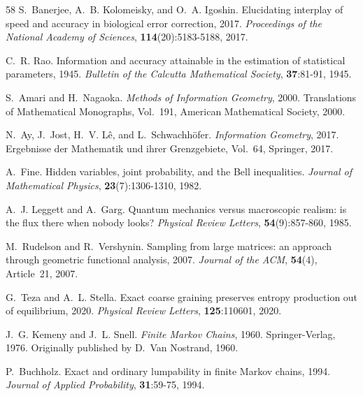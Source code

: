 \documentclass[11pt]{article}
\numberwithin{equation}{section}
\theoremstyle{thmcompact}
\theoremstyle{remark}
\begin{document}
\begin{thebibliography}{58}
{S.~Banerjee}, {A.~B. Kolomeisky}, and {O.~A. Igoshin}.
\newblock Elucidating interplay of speed and accuracy in biological error correction, 2017.
\newblock \emph{Proceedings of the National Academy of Sciences}, \textbf{114}(20):5183-5188, 2017.

{C.~R. Rao}.
\newblock Information and accuracy attainable in the estimation of statistical
  parameters, 1945.
\newblock \emph{Bulletin of the Calcutta Mathematical Society},
  \textbf{37}:81-91, 1945.

{S.~Amari} and {H.~Nagaoka}.
\newblock \emph{Methods of Information Geometry}, 2000.
\newblock Translations of Mathematical Monographs, Vol.~191, American
  Mathematical Society, 2000.

{N.~Ay}, {J.~Jost}, {H.~V. L{\^e}}, and {L.~Schwachh{\"o}fer}.
\newblock \emph{Information Geometry}, 2017.
\newblock Ergebnisse der Mathematik und ihrer Grenzgebiete, Vol.~64, Springer,
  2017.

A.~Fine.
\newblock Hidden variables, joint probability, and the {B}ell inequalities.
\newblock \emph{Journal of Mathematical Physics}, \textbf{23}(7):1306-1310,
  1982.

A.~J. Leggett and A.~Garg.
\newblock Quantum mechanics versus macroscopic realism: is the flux there when nobody looks?
\newblock \emph{Physical Review Letters}, \textbf{54}(9):857-860, 1985.

{M.~Rudelson} and {R.~Vershynin}.
\newblock Sampling from large matrices: an approach through geometric
  functional analysis, 2007.
\newblock \emph{Journal of the ACM}, \textbf{54}(4), Article~21, 2007.

{G.~Teza} and {A.~L. Stella}.
\newblock Exact coarse graining preserves entropy production out of
  equilibrium, 2020.
\newblock \emph{Physical Review Letters}, \textbf{125}:110601, 2020.

{J.~G. Kemeny} and {J.~L. Snell}.
\newblock \emph{Finite Markov Chains}, 1960.
\newblock Springer-Verlag, 1976. Originally published by D.~Van Nostrand, 1960.

{P.~Buchholz}.
\newblock Exact and ordinary lumpability in finite {M}arkov chains, 1994.
\newblock \emph{Journal of Applied Probability}, \textbf{31}:59-75, 1994.

\end{thebibliography}
\end{document}

